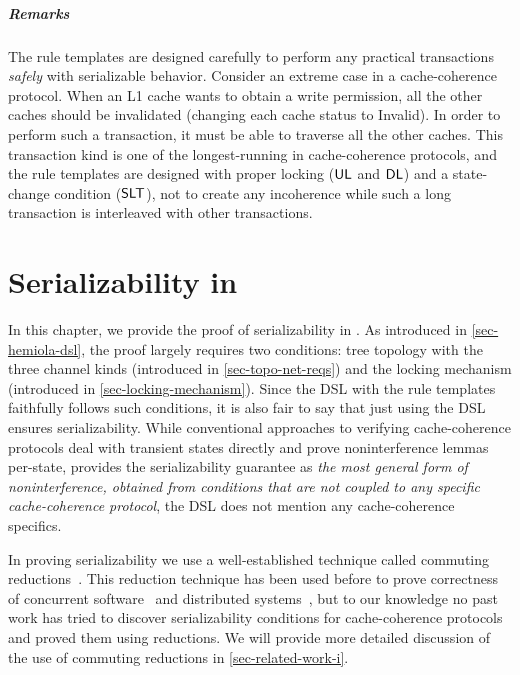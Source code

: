 \paragraph{Remarks}

The rule templates are designed carefully to perform any practical transactions \emph{safely} with serializable behavior.
Consider an extreme case in a cache-coherence protocol.
When an L1 cache wants to obtain a write permission, all the other caches should be invalidated (changing each cache status to Invalid).
In order to perform such a transaction, it must be able to traverse all the other caches.
This transaction kind is one of the longest-running in cache-coherence protocols, and the rule templates are designed with proper locking ($\textsf{UL}$ and $\textsf{DL}$) and a state-change condition ($\textsf{SLT}$), not to create any incoherence while such a long transaction is interleaved with other transactions.

\chapter{Serializability in \hemiola{}}
\label{sec-sz-guarantee-hemiola}

In this chapter, we provide the proof of serializability in \hemiola{}.
As introduced in \autoref{sec-hemiola-dsl}, the proof largely requires two conditions: tree topology with the three channel kinds (introduced in \autoref{sec-topo-net-reqs}) and the locking mechanism (introduced in \autoref{sec-locking-mechanism}).
Since the \hemiola{} DSL with the rule templates faithfully follows such conditions, it is also fair to say that just using the DSL ensures serializability.
While conventional approaches to verifying cache-coherence protocols deal with transient states directly and prove noninterference lemmas per-state, \hemiola{} provides the serializability guarantee as \emph{the most general form of noninterference, obtained from conditions that are not coupled to any specific cache-coherence protocol}, \eg{} the DSL does not mention any cache-coherence specifics.

In proving serializability we use a well-established technique called commuting reductions~\cite{reduction}.
This reduction technique has been used before to prove correctness of concurrent software~\cite{Hawblitzel:2015,Chajed:2018} and distributed systems~\cite{Hawblitzel:2017}, but to our knowledge no past work has tried to discover serializability conditions for cache-coherence protocols and proved them using reductions.
We will provide more detailed discussion of the use of commuting reductions in \autoref{sec-related-work-i}.


